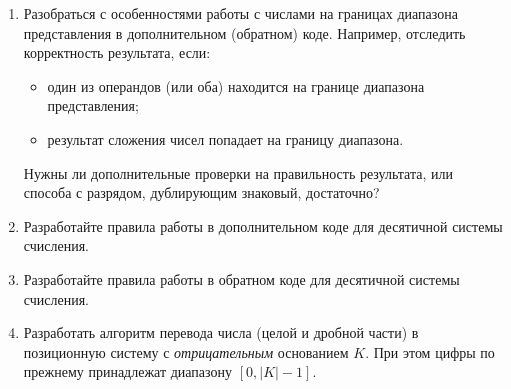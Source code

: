 \begin{enumerate}
    \item Разобраться с особенностями работы с числами на границах диапазона представления в дополнительном (обратном) коде. Например, отследить корректность результата, если:
    \begin{itemize}    
        \item один из операндов (или оба) находится на границе диапазона представления;
        \item результат сложения чисел попадает на границу диапазона.
    \end{itemize}
    Нужны ли дополнительные проверки на правильность результата, или способа с разрядом, дублирующим знаковый, достаточно?
    
    \item Разработайте правила работы в дополнительном коде для десятичной системы счисления.
    
    \item Разработайте правила работы в обратном коде для десятичной системы счисления.
    
    \item Разработать алгоритм перевода числа (целой и дробной части) в позиционную систему с \emph{отрицательным} основанием $K$. При этом цифры по прежнему принадлежат диапазону $[0, |K|-1]$.
\end{enumerate}

